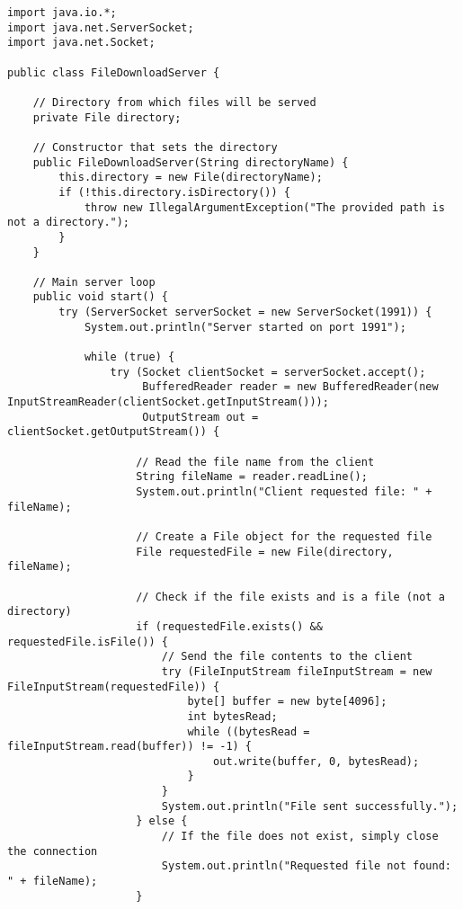 \documentclass[12pt]{article}
\begin{document}
\begin{lstlisting}
import java.io.*;
import java.net.ServerSocket;
import java.net.Socket;

public class FileDownloadServer {

    // Directory from which files will be served
    private File directory;

    // Constructor that sets the directory
    public FileDownloadServer(String directoryName) {
        this.directory = new File(directoryName);
        if (!this.directory.isDirectory()) {
            throw new IllegalArgumentException("The provided path is not a directory.");
        }
    }

    // Main server loop
    public void start() {
        try (ServerSocket serverSocket = new ServerSocket(1991)) {
            System.out.println("Server started on port 1991");

            while (true) {
                try (Socket clientSocket = serverSocket.accept();
                     BufferedReader reader = new BufferedReader(new InputStreamReader(clientSocket.getInputStream()));
                     OutputStream out = clientSocket.getOutputStream()) {

                    // Read the file name from the client
                    String fileName = reader.readLine();
                    System.out.println("Client requested file: " + fileName);

                    // Create a File object for the requested file
                    File requestedFile = new File(directory, fileName);

                    // Check if the file exists and is a file (not a directory)
                    if (requestedFile.exists() && requestedFile.isFile()) {
                        // Send the file contents to the client
                        try (FileInputStream fileInputStream = new FileInputStream(requestedFile)) {
                            byte[] buffer = new byte[4096];
                            int bytesRead;
                            while ((bytesRead = fileInputStream.read(buffer)) != -1) {
                                out.write(buffer, 0, bytesRead);
                            }
                        }
                        System.out.println("File sent successfully.");
                    } else {
                        // If the file does not exist, simply close the connection
                        System.out.println("Requested file not found: " + fileName);
                    }


\end{lstlisting}
\end{document}
